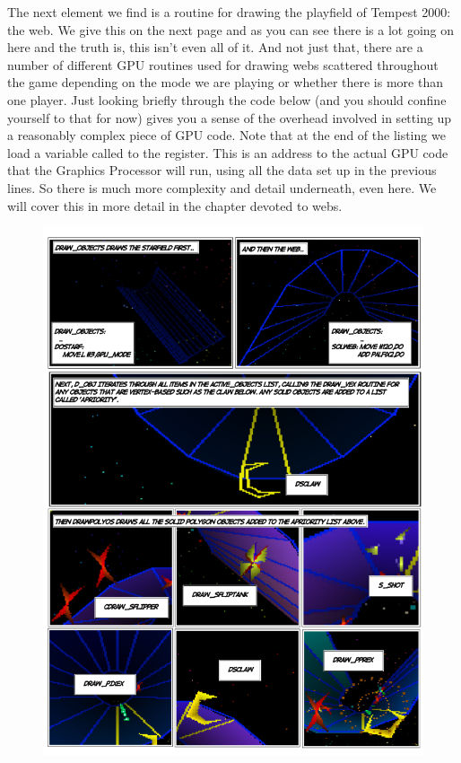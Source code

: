 The next element we find is a routine for drawing the playfield of Tempest 2000: the web. We give this on the
next page and as you can
see there is a lot going on here and the truth is, this isn't even all of it. And not just that,
there are a number of different GPU routines used for drawing webs scattered throughout the game depending
on the mode we are playing or whether there is more than one player. Just looking briefly through the code
below (and you should confine yourself to that for now) gives you a sense of the overhead involved in setting
up a reasonably complex piece of GPU code. Note that at the end of the listing we load a variable called
 to the  register. This is an address to the actual GPU code that the Graphics Processor
will run, using all the data set up in the previous lines. So there is much more complexity and detail underneath,
even here. We will cover this in more detail in the chapter devoted to webs.

\begin{figure}[H]
      \centering
      \includegraphics[width=13.7cm]{src/mainloop/mainloop-draw_objects-comic.png}%
\end{figure}

